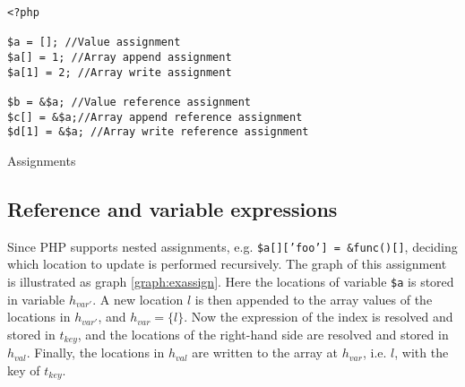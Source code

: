 \begin{graph}
{\begin{adjustbox}{max size={.24\textwidth}{.25\textheight}}
\begin{tikzpicture}[node distance = 2cm, auto]
\end{tikzpicture}\end{adjustbox}}\hfill%
\hspace*{\fill}
\end{graph}
\begin{program}
\begin{lstlisting}
<?php

$a = []; //Value assignment
$a[] = 1; //Array append assignment
$a[1] = 2; //Array write assignment

$b = &$a; //Value reference assignment
$c[] = &$a;//Array append reference assignment
$d[1] = &$a; //Array write reference assignment

\end{lstlisting}
\caption{Assignments}
\label{lst:assignments}
\end{program}

\subsection{Reference and variable expressions}
Since PHP supports nested assignments, e.g. \texttt{\$a[]['foo']  = \&func()[]}, deciding which location to update is performed recursively. The graph of this assignment is illustrated as graph \ref{graph:exassign}. Here the locations of variable \texttt{\$a} is stored in variable $h_{var'}$. A new location $l$ is then appended to the array values of the locations in $h_{var'}$, and $h_{var} = \{l\}$. Now the expression of the index is resolved and stored in $t_{key}$, and the locations of the right-hand side are resolved and stored in $h_{val}$. Finally, the locations in $h_{val}$ are written to the array at $h_{var}$, i.e. $l$, with the key of $t_{key}$. 

